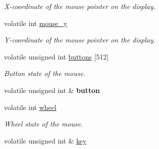 \begin{DoxyCompactItemize}
\begin{DoxyCompactList}\small\item\em X-\/coordinate of the mouse pointer on the display. \end{DoxyCompactList}\item 
\hypertarget{structcimg__library_1_1_c_img_display_afaa6caf08e8d0e42f3ca4103ffe77d9a}{volatile int \hyperlink{structcimg__library_1_1_c_img_display_afaa6caf08e8d0e42f3ca4103ffe77d9a}{mouse\-\_\-y}}\label{structcimg__library_1_1_c_img_display_afaa6caf08e8d0e42f3ca4103ffe77d9a}

\begin{DoxyCompactList}\small\item\em Y-\/coordinate of the mouse pointer on the display. \end{DoxyCompactList}\item 
\hypertarget{structcimg__library_1_1_c_img_display_aae59d1ee165597308dceb70cd89cb593}{volatile unsigned int \hyperlink{structcimg__library_1_1_c_img_display_aae59d1ee165597308dceb70cd89cb593}{buttons} \mbox{[}512\mbox{]}}\label{structcimg__library_1_1_c_img_display_aae59d1ee165597308dceb70cd89cb593}

\begin{DoxyCompactList}\small\item\em Button state of the mouse. \end{DoxyCompactList}\item 
\hypertarget{structcimg__library_1_1_c_img_display_aba09e48c5244aa402641a1799a80bef8}{volatile unsigned int \& {\bfseries button}}\label{structcimg__library_1_1_c_img_display_aba09e48c5244aa402641a1799a80bef8}

\item 
\hypertarget{structcimg__library_1_1_c_img_display_a8f9f97f8b6379c3c7dd75353ca3a432d}{volatile int \hyperlink{structcimg__library_1_1_c_img_display_a8f9f97f8b6379c3c7dd75353ca3a432d}{wheel}}\label{structcimg__library_1_1_c_img_display_a8f9f97f8b6379c3c7dd75353ca3a432d}

\begin{DoxyCompactList}\small\item\em Wheel state of the mouse. \end{DoxyCompactList}\item 
\hypertarget{structcimg__library_1_1_c_img_display_aaf5139a0c0b55bdc6b129fd3393a6443}{volatile unsigned int \& \hyperlink{structcimg__library_1_1_c_img_display_aaf5139a0c0b55bdc6b129fd3393a6443}{key}}\label{structcimg__library_1_1_c_img_display_aaf5139a0c0b55bdc6b129fd3393a6443}


\end{DoxyCompactItemize}
